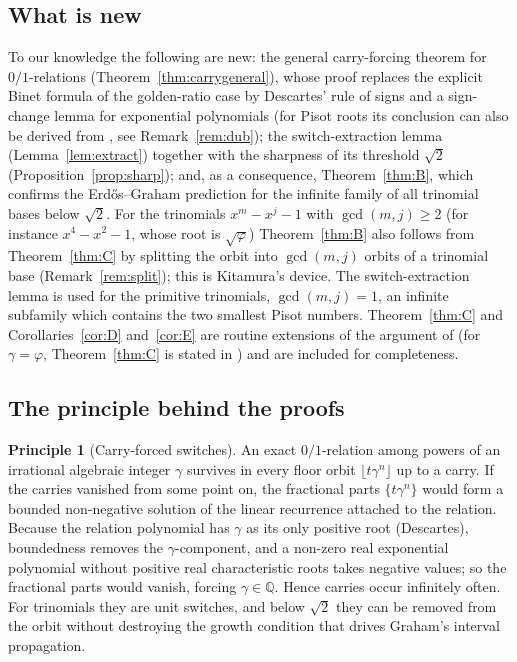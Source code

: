 \documentclass[11pt]{amsart}
\theoremstyle{definition}
\newtheorem{principle}[lemma]{Principle}
\theoremstyle{remark}
\newcommand{\Q}{\mathbb{Q}}
\newcommand{\fl}[1]{\lfloor #1\rfloor}
\newcommand{\fr}[1]{\{#1\}}
\begin{document}
\subsection{What is new}
To our knowledge the following are new: the general carry-forcing theorem for $0/1$-relations
(Theorem~\ref{thm:carrygeneral}), whose proof replaces the explicit Binet formula of the
golden-ratio case by Descartes' rule of signs and a sign-change lemma for exponential
polynomials (for Pisot roots its conclusion can also be derived from \cite{Dub06}, see
Remark~\ref{rem:dub}); the switch-extraction lemma (Lemma~\ref{lem:extract}) together with the sharpness
of its threshold $\sqrt2$ (Proposition~\ref{prop:sharp}); and, as a consequence,
Theorem~\ref{thm:B}, which confirms the Erd\H{o}s--Graham prediction for the infinite family of
all trinomial bases below $\sqrt2$. For the trinomials $x^m-x^j-1$ with $\gcd(m,j)\ge2$ (for
instance $x^4-x^2-1$, whose root is $\sqrt\varphi$) Theorem~\ref{thm:B} also follows from
Theorem~\ref{thm:C} by splitting the orbit into $\gcd(m,j)$ orbits of a trinomial base
(Remark~\ref{rem:split}); this is Kitamura's device. The switch-extraction lemma is used for the
primitive trinomials, $\gcd(m,j)=1$, an infinite subfamily which contains the two smallest Pisot
numbers. Theorem~\ref{thm:C} and Corollaries~\ref{cor:D} and~\ref{cor:E} are routine extensions
of the argument of \cite{Kit26,Rev26} (for $\gamma=\varphi$, Theorem~\ref{thm:C} is stated in
\cite{Rev26}) and are included for completeness.

\subsection{The principle behind the proofs}
\begin{principle}[Carry-forced switches]\label{prin}
An exact $0/1$-relation among powers of an irrational algebraic integer $\gamma$ survives
in every floor orbit $\fl{t\gamma^n}$ up to a carry. If the carries vanished from some
point on, the fractional parts $\fr{t\gamma^n}$ would form a bounded non-negative solution of
the linear recurrence attached to the relation. Because the relation polynomial has $\gamma$
as its only positive root (Descartes), boundedness removes the $\gamma$-component, and a
non-zero real exponential polynomial without positive real characteristic roots takes
negative values; so the fractional parts would vanish, forcing $\gamma\in\Q$. Hence carries
occur infinitely often. For trinomials they are unit switches, and below $\sqrt2$ they can
be removed from the orbit without destroying the growth condition that drives Graham's
interval propagation.
\end{principle}
\end{document}
